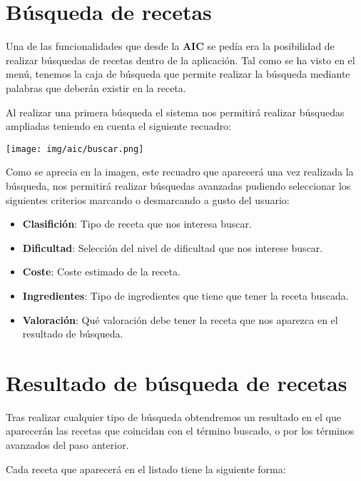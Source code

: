 \documentclass{\ClassPath/viu-tfm-template}
\begin{document}
\section{Búsqueda de recetas}

Una de las funcionalidades que desde la \textbf{AIC} se pedía era la posibilidad de realizar búsquedas de recetas dentro de la aplicación. Tal como se ha visto en el menú, tenemos la caja de búsqueda que permite realizar la búsqueda mediante palabras que deberán existir en la receta.

Al realizar una primera búsqueda el sistema nos permitirá realizar búsquedas ampliadas teniendo en cuenta el siguiente recuadro:

    \begin{center}
        \vspace{-10pt}
        \texttt{[image: img/aic/buscar.png]}
        \vspace{-20pt}
    \end{center}

Como se aprecia en la imagen, este recuadro que aparecerá una vez realizada la búsqueda, nos permitirá realizar búsquedas avanzadas pudiendo seleccionar los siguientes criterios marcando o desmarcando a gusto del usuario:

\begin{itemize}
    \item \textbf{Clasifición}: Tipo de receta que nos interesa buscar.
    \item \textbf{Dificultad}: Selección del nivel de dificultad que nos interese buscar.
    \item \textbf{Coste}: Coste estimado de la receta.
    \item \textbf{Ingredientes}: Tipo de ingredientes que tiene que tener la receta buscada.
    \item \textbf{Valoración}: Qué valoración debe tener la receta que nos aparezca en el resultado de búsqueda.
\end{itemize}


\section{Resultado de búsqueda de recetas}

Tras realizar cualquier tipo de búsqueda obtendremos un resultado en el que aparecerán las recetas que coincidan con el término buscado, o por los términos avanzados del paso anterior.

Cada receta que aparecerá en el listado tiene la siguiente forma:
\end{document}
